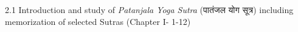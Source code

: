 


\begin{frame}[fragile]\frametitle{}
\begin{center}
{\Large 2.1 Introduction and study of \textit{Patanjala Yoga Sutra} (पातंजल योग सूत्र) including memorization of selected Sutras (Chapter I- 1-12)}
\end{center}
\end{frame}





